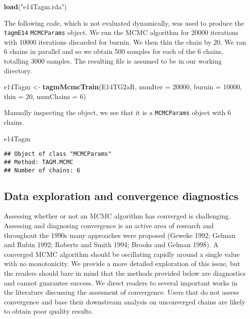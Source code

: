 \documentclass[]{article}
\newenvironment{Shaded}{\begin{snugshade}}{\end{snugshade}}
\newcommand{\KeywordTok}[1]{\textcolor[rgb]{0.13,0.29,0.53}{\textbf{{#1}}}}
\newcommand{\DataTypeTok}[1]{\textcolor[rgb]{0.13,0.29,0.53}{{#1}}}
\newcommand{\DecValTok}[1]{\textcolor[rgb]{0.00,0.00,0.81}{{#1}}}
\newcommand{\StringTok}[1]{\textcolor[rgb]{0.31,0.60,0.02}{{#1}}}
\newcommand{\NormalTok}[1]{{#1}}
\begin{document}
\begin{Shaded}
\begin{Highlighting}[]
\KeywordTok{load}\NormalTok{(}\StringTok{"e14Tagm.rda"}\NormalTok{)}
\end{Highlighting}
\end{Shaded}

The following code, which is not evaluated dynamically, was used to
produce the \texttt{tagmE14} \texttt{MCMCParams} object. We run the MCMC
algorithm for 20000 iterations with 10000 iterations discarded for
burnin. We then thin the chain by 20. We ran 6 chains in parallel and so
we obtain 500 samples for each of the 6 chains, totalling 3000 samples.
The resulting file is assumed to be in our working directory.

\begin{Shaded}
\begin{Highlighting}[]
\NormalTok{e14Tagm <-}\StringTok{ }\KeywordTok{tagmMcmcTrain}\NormalTok{(E14TG2aR,}
                         \DataTypeTok{numIter =} \DecValTok{20000}\NormalTok{,}
                         \DataTypeTok{burnin =} \DecValTok{10000}\NormalTok{,}
                         \DataTypeTok{thin =} \DecValTok{20}\NormalTok{,}
                         \DataTypeTok{numChains =} \DecValTok{6}\NormalTok{)}
\end{Highlighting}
\end{Shaded}

Manually inspecting the object, we see that it is a \texttt{MCMCParams}
object with 6 chains.

\begin{Shaded}
\begin{Highlighting}[]
\NormalTok{e14Tagm}
\end{Highlighting}
\end{Shaded}

\begin{verbatim}
## Object of class "MCMCParams"
## Method: TAGM.MCMC 
## Number of chains: 6
\end{verbatim}

\subsection{Data exploration and convergence
diagnostics}\label{data-exploration-and-convergence-diagnostics}

Assessing whether or not an MCMC algorithm has converged is challenging.
Assessing and diagnosing convergence is an active area of research and
throughout the 1990s many approaches were proposed (Geweke 1992; Gelman
and Rubin 1992; Roberts and Smith 1994; Brooks and Gelman 1998). A
converged MCMC algorithm should be oscillating rapidly around a single
value with no monotonicity. We provide a more detailed exploration of
this issue, but the readers should bare in mind that the methods
provided below are diagnostics and cannot guarantee success. We direct
readers to several important works in the literature discussing the
assesment of convergence. Users that do not assess convergence and base
their downstream analysis on unconverged chains are likely to obtain
poor quality results.
\end{document}
